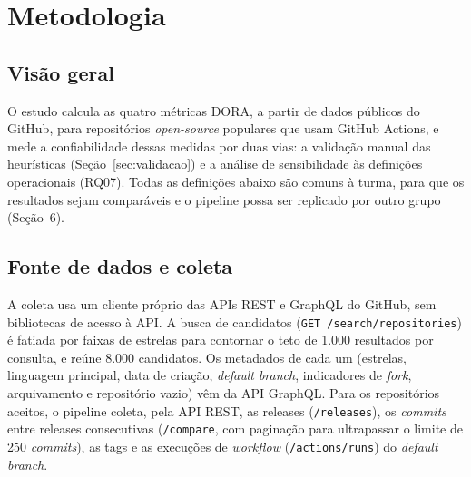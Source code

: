%

\providecommand{\apreencher}[1]{\textbf{[a preencher: #1]}}

\section{Metodologia}
\label{sec:metodologia}

\subsection{Visão geral}

O estudo calcula as quatro métricas DORA, a partir de dados públicos do GitHub,
para repositórios \textit{open-source} populares que usam GitHub Actions, e mede
a confiabilidade dessas medidas por duas vias: a validação manual das
heurísticas (Seção~\ref{sec:validacao}) e a análise de sensibilidade às
definições operacionais (RQ07). Todas as definições abaixo são comuns à turma,
para que os resultados sejam comparáveis e o pipeline possa ser replicado por
outro grupo (Seção~6).

\subsection{Fonte de dados e coleta}
\label{sec:coleta}

A coleta usa um cliente próprio das APIs REST e GraphQL do GitHub, sem
bibliotecas de acesso à API. A busca de candidatos (\texttt{GET
/search/repositories}) é fatiada por faixas de estrelas para contornar o teto de
1.000 resultados por consulta, e reúne 8.000 candidatos. Os metadados de cada
um (estrelas, linguagem principal, data de criação, \textit{default branch},
indicadores de \textit{fork}, arquivamento e repositório vazio) vêm da API
GraphQL. Para os repositórios aceitos, o pipeline coleta, pela API REST, as
releases (\texttt{/releases}), os \textit{commits} entre releases consecutivas
(\texttt{/compare}, com paginação para ultrapassar o limite de 250 \textit{commits}),
as tags e as execuções de \textit{workflow} (\texttt{/actions/runs}) do
\textit{default branch}.

